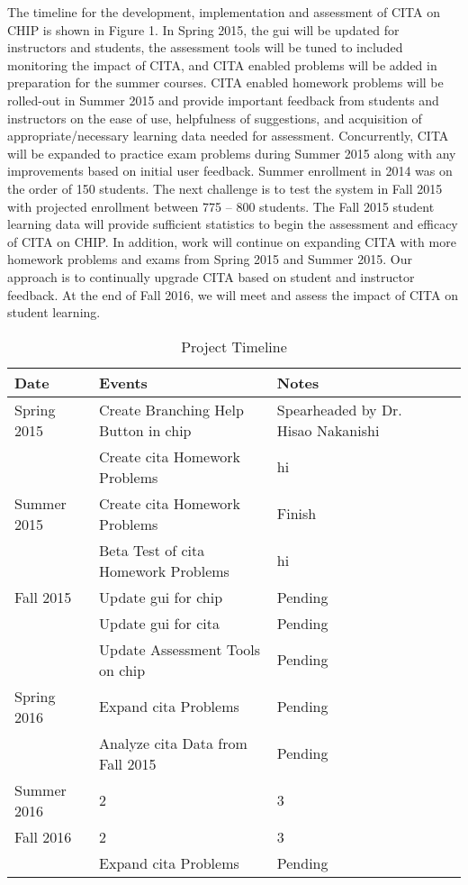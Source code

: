 The timeline for the development, implementation and assessment of CITA on CHIP is shown in Figure 1. In Spring 2015, the \gls{gui} will be updated for instructors and students, the
assessment tools will be tuned to included monitoring the impact of CITA, and CITA enabled
problems will be added in preparation for the summer courses. CITA enabled homework
problems will be rolled-out in Summer 2015 and provide important feedback from students and
instructors on the ease of use, helpfulness of suggestions, and acquisition of
appropriate/necessary learning data needed for assessment. Concurrently, CITA will be
expanded to practice exam problems during Summer 2015 along with any improvements based
on initial user feedback. Summer enrollment in 2014 was on the order of 150 students. The next
challenge is to test the system in Fall 2015 with projected enrollment between 775 – 800
students. The Fall 2015 student learning data will provide sufficient statistics to begin the
assessment and efficacy of CITA on CHIP. In addition, work will continue on expanding CITA
with more homework problems and exams from Spring 2015 and Summer 2015. Our approach
is to continually upgrade CITA based on student and instructor feedback. At the end of Fall
2016, we will meet and assess the impact of
CITA on student learning.

\begin{table}[!ht]
  \centering
  \begin{tabular}{|l|l|l|l|}
    \hline
    \textbf{Date} & \textbf{Events} & \textbf{Notes}\\
	\hline
	Spring 2015 & Create Branching Help Button in \gls{chip} & Spearheaded by Dr. Hisao Nakanishi\\
	& Create \gls{cita} Homework Problems & hi\\
	\hline
	Summer 2015 & Create \gls{cita} Homework Problems & Finish\\
	& Beta Test of \gls{cita} Homework Problems & hi\\
	\hline
	Fall 2015 & Update \gls{gui} for \gls{chip} & Pending\\
	& Update \gls{gui} for \gls{cita} & Pending\\
	& Update Assessment Tools on \gls{chip} & Pending\\
	\hline
	Spring 2016 & Expand \gls{cita} Problems & Pending\\
	& Analyze \gls{cita} Data from Fall 2015 & Pending\\
	Summer 2016 & 2 & 3\\
	Fall 2016 & 2 & 3\\
	& Expand \gls{cita} Problems & Pending\\
	\hline
  \end{tabular}
  \caption{Project Timeline}
  \label{tab:timeline}
\end{table}